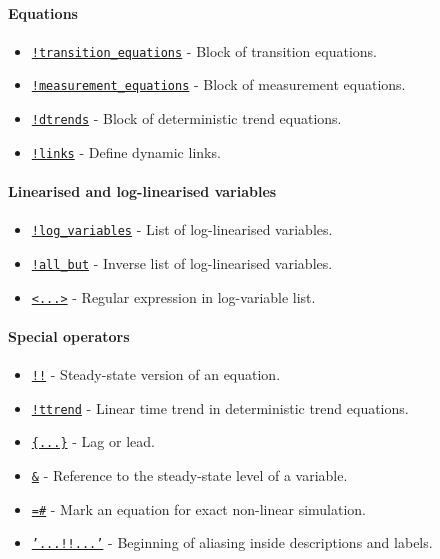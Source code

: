  \paragraph{Equations}
 
 \begin{itemize}
 \item
   \href{modellang/transitionequations}{\texttt{!transition\_equations}}
   - Block of transition equations.
 \item
   \href{modellang/measurementequations}{\texttt{!measurement\_equations}}
   - Block of measurement equations.
 \item
   \href{modellang/dtrends}{\texttt{!dtrends}} - Block of deterministic
   trend equations.
 \item
   \href{modellang/links}{\texttt{!links}} - Define dynamic links.
 \end{itemize}
 
 \paragraph{Linearised and log-linearised variables}
 
 \begin{itemize}
 \item
   \href{modellang/logvariables}{\texttt{!log\_variables}} - List of
   log-linearised variables.
 \item
   \href{modellang/allbut}{\texttt{!all\_but}} - Inverse list of
   log-linearised variables.
 \item
   \href{modellang/regexpression}{\texttt{\textless{}...\textgreater{}}}
   - Regular expression in log-variable list.
 \end{itemize}
 
 \paragraph{Special operators}
 
 \begin{itemize}
 \item
   \href{modellang/sstateversion}{\texttt{!!}} - Steady-state version of
   an equation.
 \item
   \href{modellang/ttrend}{\texttt{!ttrend}} - Linear time trend in
   deterministic trend equations.
 \item
   \href{modellang/laglead}{\texttt{\{...\}}} - Lag or lead.
 \item
   \href{modellang/sstateref}{\texttt{\&}} - Reference to the
   steady-state level of a variable.
 \item
   \href{modellang/exactnonlin}{\texttt{=\#}} - Mark an equation for
   exact non-linear simulation.
 \item
   \href{modellang/alias}{\texttt{'...!!...'}} - Beginning of aliasing
   inside descriptions and labels.
 \end{itemize}
 
